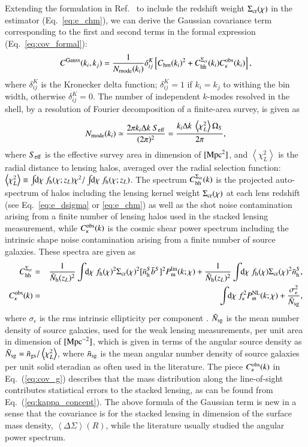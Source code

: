 \documentclass[onecolumn,notitlepage,showpacs,amsmath,amssymb,prd,floatfix]{revtex4-1}
\def\ave#1{\left\langle #1 \right\rangle}
\newcommand{\dr}{\mathrm{d}}
\newcommand{\chm}{C_{\mathrm{hm}}}
\newcommand{\chh}{C_{\mathrm{hh}}}
\newcommand{\bnhs}{\bar{n}_{\rm h}^S}
\newcommand{\pml}{P^{\rm lin}_{\rm m}}
\newcommand{\sigmacr}{\Sigma_{\rm cr}}
\newcommand{\bNh}{\bar{N}_{\rm h}}
\newcommand{\dsigma}{\Delta\Sigma}
\begin{document}
Extending the formulation in Ref.~\cite{OguriTakada:11} to include the
redshift weight $\sigmacr(\chi)$ in the estimator (Eq.~\ref{eq:e_chm}),
we can derive the Gaussian covariance term corresponding to the first
and second terms in the formal expression (Eq.~\ref{eq:cov_formal}):
%
\begin{equation}
 C^{\rm Gauss}(k_i,k_j)=\frac{1}{N_{\rm
  mode}(k_i)}\delta^K_{ij}\left[\chm(k_i)^2+C^{\sigmacr}_{\rm
			   hh}(k_i)C^{\rm obs}_\kappa(k_i)\right],
\label{eq:cov_g}
\end{equation}
%
where $\delta^K_{ij}$ is the Kronecker delta function; $\delta^K_{ij}=1$
if $k_i=k_j$ to withing the bin width, otherwise $\delta^K_{ij}=0$. The
number of independent $k$-modes resolved in the shell, by a resolution
of Fourier decomposition of a finite-area survey, is given as
%
\begin{equation}
N_{\rm mode}(k_i)\simeq \frac{2\pi k_i \Delta k~ S_{\rm
 eff}}{(2\pi)^2}=\frac{k_i\Delta k~ \ave{\chi_L^2}\Omega_S}{2\pi}, 
\end{equation}
%
where $S_{\rm eff}$ is the effective survey area in dimension of $[{\rm
Mpc}^2]$, and $\ave{\chi_L^2}$ is the radial distance to lensing halos,
averaged over the radial selection function: $\ave{\chi_L^2}\equiv
\int\!\!\dr\chi~f_{\rm h}(\chi;z_L)\chi^2/\int\!\!\dr\chi~f_{\rm
h}(\chi;z_L)$. The spectrum $\chh^{\sigmacr}(k)$ is the projected
auto-spectrum of halos including the lensing kernel weight
$\sigmacr(\chi)$ at each lens redshift (see Eq.~\ref{eq:e_dsigma} or
\ref{eq:e_chm}) as well as the shot noise contamination arising from a
finite number of lensing halos used in the stacked lensing measurement,
while $C_\kappa^{\rm obs}(k)$ is the cosmic shear power spectrum
including the intrinsic shape noise contamination arising from a finite
number of source galaxies. These spectra are given as
%
\begin{eqnarray}
\chh^{\sigmacr}&=&\frac{1}{\bNh(z_L)^2}\int\!\!\dr\chi~f_{\rm
 h}(\chi)^2\sigmacr(\chi)^2
 [\bnhs\bar{b}^S]^2\pml(k;\chi) +
 \frac{1}{\bNh(z_L)^2}\int\!\!\dr\chi~f_{\rm
 h}(\chi)\sigmacr(\chi)^2\bnhs,\nonumber\\
 C_\kappa^{\rm obs}(k)&=&\int\!\!\dr\chi~f_\kappa^2P^{\rm
  NL}_m(k;\chi)+\frac{\sigma_\epsilon^2}{\bar{N}_{\rm sg}},
\end{eqnarray}
%
where $\sigma_\epsilon$ is the rms intrinsic ellipticity per component
\cite{TakadaJain:03}. $\bar{N}_{\rm sg}$ is the mean number density of
source galaxies, used for the weak lensing measurements, per unit area
in dimension of $[{\rm Mpc}^{-2}]$, which is given in terms of the
angular source density as $\bar{N}_{\rm sg}=\bar{n}_{\rm
gs}/\ave{\chi_L^2}$, where $\bar{n}_{\rm sg}$ is the mean angular number
density of source galaxies per unit solid steradian as often used in the
literature.  The piece $C_\kappa^{\rm obs}(k)$ in Eq.~(\ref{eq:cov_g})
describes that the mass distribution along the line-of-sight contributes
statistical errors to the stacked lensing, as can be found from
Eq.~(\ref{eq:kappa_concept}).  The above formula of the Gaussian term is
new in a sense that the covariance is for the stacked lensing in
dimension of the surface mass density, $\ave{\dsigma}(R)$, while the
literature usually studied the angular power spectrum.
\end{document}
